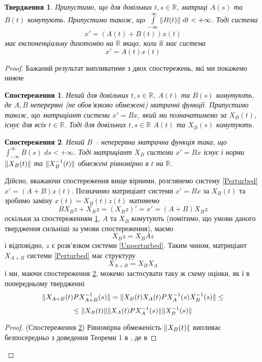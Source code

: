 \documentclass[14pt]{extarticle} %
\newtheorem{observation}{Спостереження}
\newtheorem{proposition}{Твердження}
\theoremstyle{remark}
\begin{document}
\begin{proposition}
	\label{strong}
	Припустимо, що для довільних $t,s\in\mathbb{R}$, матриці $A(s)$ та $B(t)$ комутують.
	Припустимо також, що $\int_{-\infty}^\infty\mynorm{B(t)}\;dt<+\infty$. Тоді система 
	\begin{equation}\label{Perturbed}
	x'=(A(t)+B(t))x(t)
	\end{equation}
	має експоненціальну дихотомію на $\mathbb{R}$ якщо, коли її має система
	\begin{equation}\label{Unperturbed}
	x'=A(t)x(t)
	\end{equation}
\end{proposition}
\begin{proof}
	Бажаний результат випливатиме з двох спостережень, які ми покажемо нижче
	\begin{observation}\label{Hard}Нехай для довільних $t,s\in\mathbb{R}$, $A(t)$ та $B(s)$ комутують, де $A,B$ неперервні
	(не обов’язково обмежені) матричні функції. Припустимо також, що матриціант системи $x'=Bx$, який ми позначатимемо за
	$X_B(t)$, існує для всіх $t\in\mathbb{R}$. Тоді для довільних $t,s\in\mathbb{R}$ $A(t)$ та $X_B(s)$ комутують.\end{observation}
	\begin{observation}\label{Easy}Нехай $B$ -- неперервна матрична функція така, що $\int_{-\infty}^\infty B(s)\;ds<+\infty$. Тоді матриціант
		$X_B$ системи $x'=Bx$ існує і норми $\|X_B(t)\|$ та $\|X^{-1}_B(t)\|$ обмежені рівномірно в $t$ на $\mathbb{R}$.
	\end{observation}
	Дійсно, вважаючи спостереження вище вірними, розглянемо систему \ref{Perturbed} $x'=(A+B)x(t)$. Позначимо матриціант системи $x'=Bx$
	за $X_B(t)$ та зробимо заміну $x(t)=X_B(t)z(t)$ матимемо
	\[BX_Bz+X_B\dot{z}=(X_Bz)'=x'=(A+B)X_Bz\]
	оскільки за спостереженням \ref{Hard}, $A$ та $X_B$ комутують (помітимо, що умови даного твердження сильніші за умови спостереження), маємо
	\[X_B\dot{z}=X_BAz\]
	і відповідно, $z$ є розв’язком системи \ref{Unperturbed}. Таким чином, матриціант $X_{A+B}$ системи \ref{Perturbed}
	має структуру
	\[X_{A+B}=X_BX_A\]
	і ми, маючи спостереження \ref{Easy}, можемо застосувати таку ж схему оцінки, як і в попередньому твердженні
	\[\|X_{A+B}(t)PX^{-1}_{A+B}(s)\|=\|X_B(t)X_A(t)PX^{-1}_A(s)X^{-1}_B(s)\|\leq\]
	\[\leq\|X_B(t)\|\|X_A(t)PX^{-1}_A(s)\|\|X_B^{-1}(s)\|\]
	\begin{proof}{(Спостереження \ref{Easy})} Рівномірна обмеженість $\|X_B(t)\|$
	випливає безпосередньо з доведення Теореми 1 в \cite[\S 12]{demidovich}, де в 

\end{proof}
\end{proof}
\end{document}
